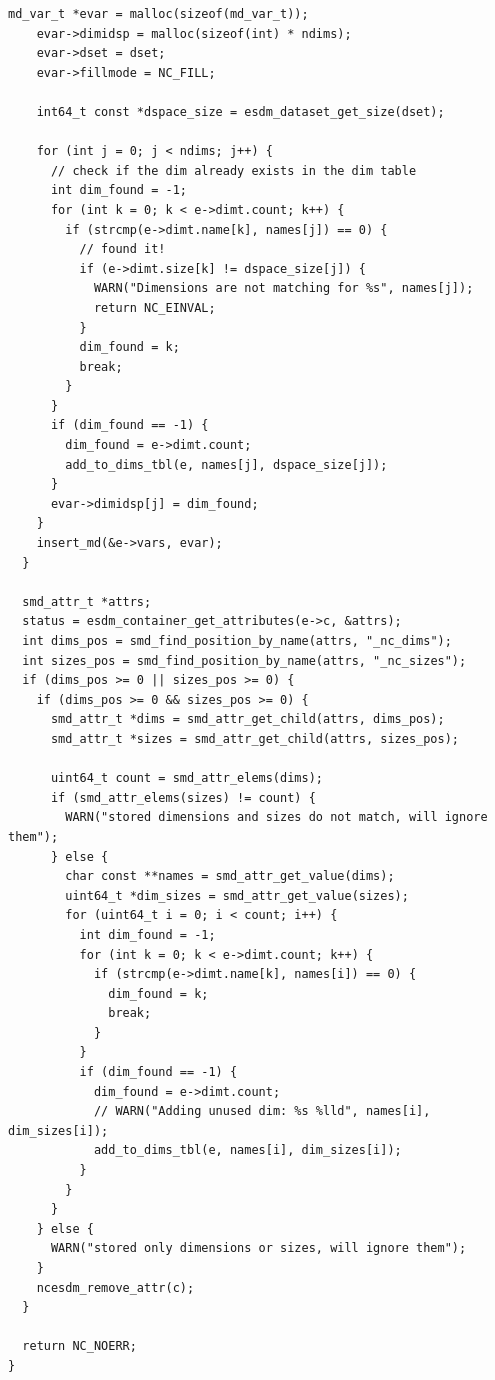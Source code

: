 \begin{lstlisting}[upquote=true]
    md_var_t *evar = malloc(sizeof(md_var_t));
    evar->dimidsp = malloc(sizeof(int) * ndims);
    evar->dset = dset;
    evar->fillmode = NC_FILL;

    int64_t const *dspace_size = esdm_dataset_get_size(dset);

    for (int j = 0; j < ndims; j++) {
      // check if the dim already exists in the dim table
      int dim_found = -1;
      for (int k = 0; k < e->dimt.count; k++) {
        if (strcmp(e->dimt.name[k], names[j]) == 0) {
          // found it!
          if (e->dimt.size[k] != dspace_size[j]) {
            WARN("Dimensions are not matching for %s", names[j]);
            return NC_EINVAL;
          }
          dim_found = k;
          break;
        }
      }
      if (dim_found == -1) {
        dim_found = e->dimt.count;
        add_to_dims_tbl(e, names[j], dspace_size[j]);
      }
      evar->dimidsp[j] = dim_found;
    }
    insert_md(&e->vars, evar);
  }

  smd_attr_t *attrs;
  status = esdm_container_get_attributes(e->c, &attrs);
  int dims_pos = smd_find_position_by_name(attrs, "_nc_dims");
  int sizes_pos = smd_find_position_by_name(attrs, "_nc_sizes");
  if (dims_pos >= 0 || sizes_pos >= 0) {
    if (dims_pos >= 0 && sizes_pos >= 0) {
      smd_attr_t *dims = smd_attr_get_child(attrs, dims_pos);
      smd_attr_t *sizes = smd_attr_get_child(attrs, sizes_pos);

      uint64_t count = smd_attr_elems(dims);
      if (smd_attr_elems(sizes) != count) {
        WARN("stored dimensions and sizes do not match, will ignore them");
      } else {
        char const **names = smd_attr_get_value(dims);
        uint64_t *dim_sizes = smd_attr_get_value(sizes);
        for (uint64_t i = 0; i < count; i++) {
          int dim_found = -1;
          for (int k = 0; k < e->dimt.count; k++) {
            if (strcmp(e->dimt.name[k], names[i]) == 0) {
              dim_found = k;
              break;
            }
          }
          if (dim_found == -1) {
            dim_found = e->dimt.count;
            // WARN("Adding unused dim: %s %lld", names[i], dim_sizes[i]);
            add_to_dims_tbl(e, names[i], dim_sizes[i]);
          }
        }
      }
    } else {
      WARN("stored only dimensions or sizes, will ignore them");
    }
    ncesdm_remove_attr(c);
  }

  return NC_NOERR;
}
\end{lstlisting}

